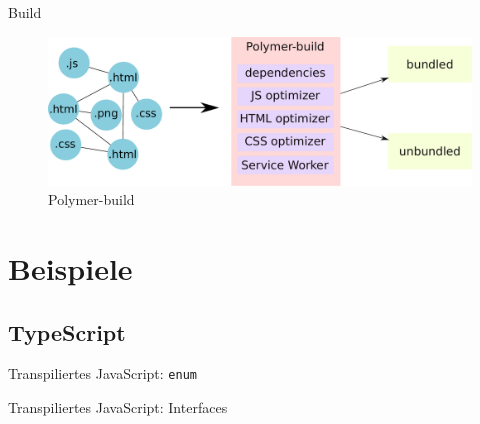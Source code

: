 \documentclass{beamer}
\begin{document}
\begin{frame}{Build}
	\begin{figure}
		\centering
		\includegraphics[width=\textwidth]{gfx/Polymer-build}
		\caption{Polymer-build}
		\label{fig:polymer-build}
	\end{figure}
\end{frame}

\section{Beispiele}
\subsection{TypeScript}
\begin{frame}[fragile]{Transpiliertes JavaScript: \texttt{enum}}
	\begin{minipage}{.4\textwidth}
		
	\end{minipage}
	\hfill
	\begin{minipage}{.5\textwidth}
		
	\end{minipage}
\end{frame}

\begin{frame}[fragile]{Transpiliertes JavaScript: Interfaces}
	
\end{frame}

%		
%		
\end{document}
